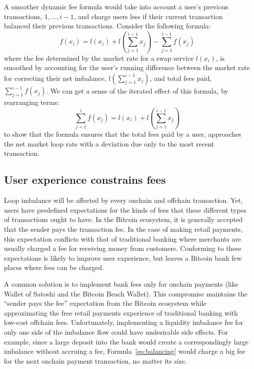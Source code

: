 \documentclass[10pt,twocolumn]{article}
\begin{document}
A smoother dynamic fee formula would take into account
a user's previous transactions, $1,...,i-1$, and charge
users less if their current transaction balanced their previous transactions.
Consider the following formula:
\begin{equation} \label{eq:balancing}
	f(x_i) = l(x_i) +
		l\left(\sum_{j=1}^{i-1} x_j\right) -
		\sum_{j=1}^{i-1} f(x_j)
\end{equation}
where the fee determined by the market rate for a swap service $l(x_i)$,
is smoothed by accounting for the user's running difference between
the market rate for correcting their net imbalance, $l\left(\sum_{j=1}^{i-1} x_j\right)$, and
total fees paid, $\sum_{j=1}^{i-1} f(x_j)$.
We can get a sense of the iterated effect of this formula,
by rearranging terms:
\begin{equation}
	\sum_{j=1}^{i} f(x_j)  =
		l(x_i) + l\left(\sum_{j=1}^{i-1}x_j\right)
\end{equation}
to show that the formula ensures that
the total fees paid by a user, approaches the net market loop rate
with a deviation due only to the most recent transaction.

\subsection{User experience constrains fees}

Loop imbalance will be affected by every onchain and offchain transaction.
Yet, users have predefined expectations for the kinds of fees
that these different types of transactions ought to have.
In the Bitcoin ecosystem, it is generally accepted
that the sender pays the transaction fee.
In the case of making retail payments,
this expectation conflicts with that of traditional banking where
merchants are usually charged a fee for receiving money from customers.
Conforming to these expectations is likely to improve user experience,
but leaves a Bitcoin bank few places where fees can be charged.

A common solution
is to implement bank fees only for onchain payments
(like Wallet of Satoshi and the Bitcoin Beach Wallet).
This compromise maintains the ``sender pays the fee''
expectation from the Bitcoin ecosystem while
approximating the free retail payments experience of traditional banking
with low-cost offchain fees.
Unfortunately, implementing a liquidity imbalance fee for only one side of the imbalance flow
could have undesirable side effects.
For example, since a large deposit into the bank would
create a correspondingly large imbalance without accruing a fee,
Formula~\ref{eq:balancing}
would charge a big fee for the next
onchain payment transaction, no matter its size.
\end{document}
